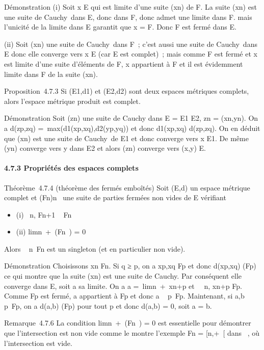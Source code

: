 Démonstration (i) Soit x \in E qui est limite d'une suite (xn)
de F. La suite (xn) est une suite de Cauchy~dans E, donc dans
F, donc admet une limite \ell dans F. mais l'unicité de la limite dans E
garantit que x = \ell \in F. Donc F est fermé dans E.

(ii) Soit (xn) une suite de Cauchy~dans F~; c'est aussi une
suite de Cauchy~dans E donc elle converge vers x \in E (car E est
complet)~; mais comme F est fermé et x est limite d'une suite d'éléments
de F, x appartient à F et il est évidemment limite dans F de la suite
(xn).

Proposition~4.7.3 Si (E1,d1) et
(E2,d2) sont deux espaces métriques complets, alors
l'espace métrique produit est complet.

Démonstration Soit (zn) une suite de Cauchy dans E =
E1 \times E2, zn = (xn,yn).
On a d(zp,zq) =\
max(d1(xp,xq),d2(yp,yq))
et donc d1(xp,xq) \leq
d(zp,zq). On en déduit que (xn) est une
suite de Cauchy~de E1 et donc converge vers x \in E1.
De même (yn) converge vers y dans E2 et alors
(zn) converge vers (x,y) \in E.

\paragraph{4.7.3 Propriétés des espaces complets}

Théorème~4.7.4 (théorème des fermés emboîtés) Soit (E,d) un espace
métrique complet et (Fn)n\in\mathbb{N}~ une suite de parties
fermées non vides de E vérifiant

\begin{itemize}
\itemsep1pt\parskip0pt
\item
  (i) \forall~n, Fn+1 \subset~ Fn~
\item
  (ii) limn\rightarrow~+\infty~\delta(Fn~) = 0
\end{itemize}

Alors \⋂ ~
n\in{}~Fn est un singleton (et en particulier non vide).

Démonstration Choisissons xn \in Fn. Si q ≥ p, on a
xp,xq \in Fp et donc
d(xp,xq) \leq \delta(Fp) ce qui montre que la
suite (xn) est une suite de Cauchy. Par conséquent elle
converge dans E, soit a sa limite. On a a =\
limn\rightarrow~+\infty~xn+p et \forall~~n,
xn+p \in Fp. Comme Fp est fermé, a
appartient à Fp et donc a
\in\⋂ ~
p\in{}~Fp. Maintenant, si a,b
\in\⋂ ~
p\in\mathbb{N}~Fp, on a d(a,b) \leq \delta(Fp) pour tout p et
donc d(a,b) = 0, soit a = b.

Remarque~4.7.6 La condition
limn\rightarrow~+\infty~\delta(Fn~) = 0 est
essentielle pour démontrer que l'intersection est non vide comme le
montre l'exemple Fn = {[}n,+\infty~{[} dans ~, où l'intersection est
vide.

